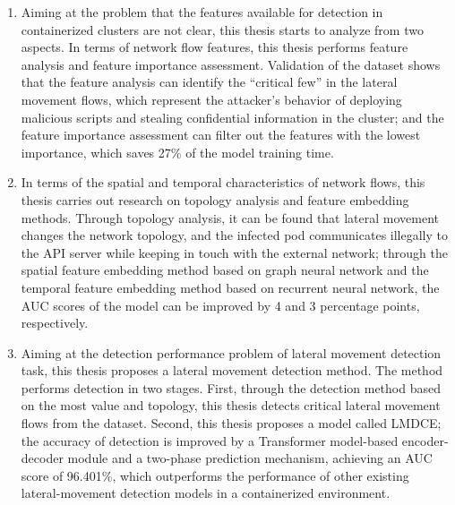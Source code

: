 \begin{enumerate}
    \item Aiming at the problem that the features available for detection in containerized clusters are not clear, this thesis starts to analyze from two aspects. In terms of network flow features, this thesis performs feature analysis and feature importance assessment. Validation of the dataset shows that the feature analysis can identify the ``critical few'' in the lateral movement flows, which represent the attacker's behavior of deploying malicious scripts and stealing confidential information in the cluster; and the feature importance assessment can filter out the features with the lowest importance, which saves 27\% of the model training time. 

    \item In terms of the spatial and temporal characteristics of network flows, this thesis carries out research on topology analysis and feature embedding methods. Through topology analysis, it can be found that lateral movement changes the network topology, and the infected pod communicates illegally to the API server while keeping in touch with the external network; through the spatial feature embedding method based on graph neural network and the temporal feature embedding method based on recurrent neural network, the AUC scores of the model can be improved by 4 and 3 percentage points, respectively.

    \item Aiming at the detection performance problem of lateral movement detection task, this thesis proposes a lateral movement detection method. The method performs detection in two stages. First, through the detection method based on the most value and topology, this thesis detects critical lateral movement flows from the dataset. Second, this thesis proposes a model called LMDCE; the accuracy of detection is improved by a Transformer model-based encoder-decoder module and a two-phase prediction mechanism, achieving an AUC score of 96.401\%, which outperforms the performance of other existing lateral-movement detection models in a containerized environment.
\end{enumerate}


\pagestyle{enfrontmatterstyle}%
\cleardoublepage\pagestyle{frontmatterstyle}%

